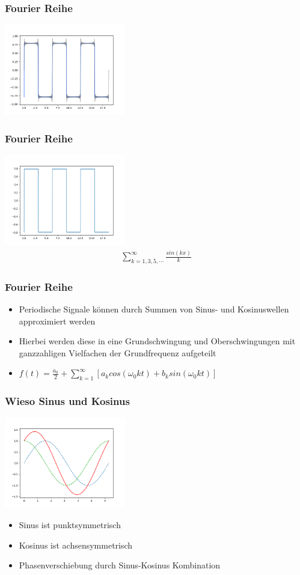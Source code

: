 \begin{frame}
	\frametitle{Fourier Reihe}
	\includegraphics[width=200px]{images/00-rect-5.png}
\end{frame}

\begin{frame}
	\frametitle{Fourier Reihe}
	\includegraphics[width=200px]{images/00-rect-6.png}
	\begin{align}
		\sum_{k=1,3,5,\cdots}^{\infty}\frac{sin(kx)}{k}
	\end{align}
\end{frame}

\begin{frame}
	\frametitle{Fourier Reihe}
	\begin{itemize}
		\item Periodische Signale können durch Summen von Sinus- und Kosinuswellen approximiert werden
		\item Hierbei werden diese in eine Grundschwingung und Oberschwingungen mit ganzzahligen Vielfachen der Grundfrequenz aufgeteilt
		\item $f(t) = \displaystyle\frac{a_0}{2} + \displaystyle \sum_{k=1}^{\infty}\left[a_k cos(\omega_0 kt) + b_k sin(\omega_0 kt)\right]$
	\end{itemize}
\end{frame}

\begin{frame}
	\frametitle{Wieso Sinus und Kosinus}
	\includegraphics[width=200px]{images/00-sincos.png}
	\begin{itemize}
		\item Sinus ist punktsymmetrisch
		\item Kosinus ist achsensymmetrisch
		\item Phasenverschiebung durch Sinus-Kosinus Kombination
	\end{itemize}
\end{frame}

